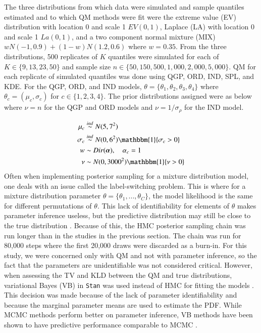 \documentclass[preprint,12pt,authoryear]{elsarticle}
\begin{document}
The three distributions from which data were simulated and sample quantiles estimated and to which QM methods were fit were the extreme value (EV) distribution with location 0 and scale 1 $EV(0,1)$, Laplace (LA) with location 0 and scale 1 $La(0,1)$, and a two component normal mixture (MIX) $w N(-1, 0.9) + (1-w)N(1.2, 0.6)$ where $w = 0.35$. From the three distributions, 500 replicates of $K$ quantiles were simulated for each of 
$K \in \{9, 13, 23, 50\}$ and sample size $n \in \{50, 150, 500, 1{,}000, 2{,}000, 5{,}000\}$. QM for each replicate of simulated quantiles was done using QGP, ORD, IND, SPL, and KDE. For the QGP, ORD, and IND models, $\theta = \{\theta_1, \theta_2, \theta_3, \theta_4\}$ where $\theta_c = (\mu_c, \sigma_c)$ for $c \in \{1,2,3,4\}$. The prior distributions assigned were as below where $\nu = n$ for the QGP and ORD models and $\nu = 1/\sigma_{\rho}$ for the IND model. 

\begin{equation*}
    \begin{align*}
        \mu_c &\overset{ind}{\sim} N(5, 7^2) \\
        \sigma_c &\overset{ind}{\sim} N(0, 6^2)\mathbbm{1}\{\sigma_c > 0\} \\ 
        w &\sim Dir(\boldsymbol{\alpha}), \quad \alpha_c = 1 \\
        \nu &\sim N(0, 3000^2)\mathbbm{1}\{\nu > 0\}
    \end{align*}
\end{equation*} %
Often when implementing posterior sampling for a mixture distribution model, one deals with an issue called the label-switching problem. This is where for a mixture distribution parameter $\theta = \{\theta_1,...,\theta_C\}$, the model likelihood is the same for different permutations of $\theta$. This lack of identifiability for elements of $\theta$ makes parameter inference useless, but the predictive distribution may still be close to the true distribution \cite[]{stephens2000dealing}.
Because of this, the HMC posterior sampling chain was run longer than in the studies in the previous section. The chain was run for 80,000 steps where the first 20,000 draws were discarded as a burn-in. For this study, we were concerned only with QM and not with parameter inference, so the fact that the parameters are unidentifiable was not considered critical. However, when assessing the TV and KLD between the QM and true distributions, variational Bayes (VB) in \texttt{Stan} was used instead of HMC for fitting the models \cite[]{kucukelbir2015automatic}. This decision was made because of the lack of parameter identifiability and because the marginal parameter means are used to estimate the PDF. While MCMC methods perform better on parameter inference, VB methods have been shown to have predictive performance comparable to MCMC \cite[]{blei2017variational}.
\end{document}
